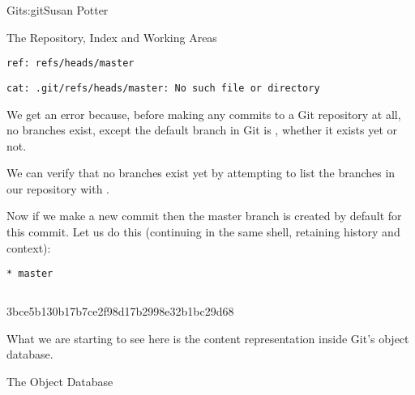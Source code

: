 \begin{aosachapter}{Git}{s:git}{Susan Potter}
\begin{aosasect1}{The Repository, Index and Working Areas}
\begin{aosaitemize}
  \item {}
  \item {}
\begin{verbatim}
ref: refs/heads/master
\end{verbatim}
  \item {}
  \item {}
\begin{verbatim}
cat: .git/refs/heads/master: No such file or directory
\end{verbatim}
\end{aosaitemize}

We get an error because, before making any commits to a Git repository at
all, no branches exist, except the default branch in Git is ,
whether it exists yet or not.

We can verify that no branches exist yet by attempting to list the branches
in our repository with .

Now if we make a new commit then the master branch is created by default for
this commit. Let us do this (continuing in the same shell, retaining
history and context):

\begin{aosaitemize}
  \item {}
  \item {}
\begin{verbatim}
* master
\end{verbatim}
  \item {}
\begin{verbatim}
\end{verbatim}
3bce5b130b17b7ce2f98d17b2998e32b1bc29d68
\end{aosaitemize}
  \item {}
\end{aosasect1}

What we are starting to see here is the content representation inside Git's
object database.

\begin{aosasect1}{The Object Database}



\end{aosasect1}
\end{aosachapter}

